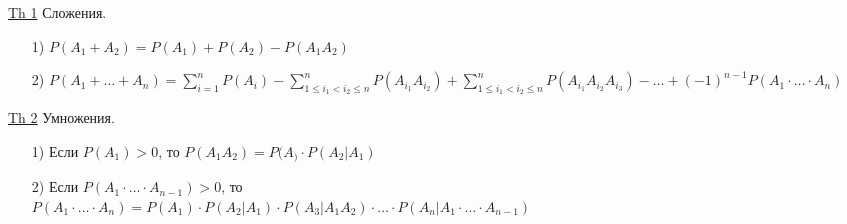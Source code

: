 
\underline{Th 1} Сложения. \\
\begin{enumerate}
\item[1)] $P(A_1 + A_2) = P(A_1) + P(A_2) - P(A_1 A_2)$ \\

\item[2)] $P(A_1 + \ldots + A_n) = \sum\limits_{i = 1}^{n} P(A_i) - \sum\limits_{1 \leqslant i_1 < i_2 \leqslant n}^{n} P(A_{i_1} A_{i_2}) + \sum\limits_{1 \leqslant i_1 < i_2 \leqslant n}^{n} P(A_{i_1} A_{i_2} A_{i_3}) - \ldots + (-1)^{n - 1} P(A_1 \cdot \ldots \cdot A_n)$ \\
\end{enumerate}


\underline{Th 2} Умножения. \\
\begin{enumerate}
\item[1)] Если $P(A_1) > 0$, то $P(A_1 A_2) = P(A_) \cdot P(A_2|A_1)$ \\

\item[2)] Если $P(A_1 \cdot \ldots \cdot A_{n-1}) > 0$, то \\
$P(A_1 \cdot \ldots \cdot A_n) = P(A_1) \cdot P(A_2|A_1) \cdot P(A_3|A_1 A_2) \cdot \ldots \cdot P(A_n|A_1 \cdot \ldots \cdot A_{n-1})$ \\
\end{enumerate}


